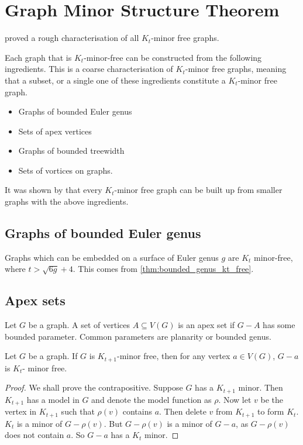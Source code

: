 \section{Graph Minor Structure Theorem}\label{sec:Kt_Minor_Free}
\textcite{robertsonGraphMinorsXVII1999} proved a rough characterisation of all \(K_t\)-minor free graphs. 

Each graph that is $K_t$-minor-free can be constructed from the following ingredients. This is a coarse characterisation of $K_t$-minor free graphs, meaning that a subset, or a single one of these ingredients constitute a $K_t$-minor free graph. 
\begin{itemize}
	\item Graphs of bounded Euler genus
	\item Sets of apex vertices
	\item Graphs of bounded treewidth
	\item Sets of vortices on graphs.
\end{itemize}
It was shown by \textcite{robertsonGraphMinorsXVII1999} that every \(K_t\)-minor free graph can be built up from smaller graphs with the above ingredients.

\subsection{Graphs of bounded Euler genus}

Graphs which can be embedded on a surface of Euler genus $g$ are $K_t$ minor-free, where \(t > \sqrt{6g} + 4\). This comes from \cref{thm:bounded_genus_kt_free}. 

\subsection{Apex sets}\label{sssec:Apex_Vertices}
Let $G$ be a graph. A set of vertices $A \subseteq V(G)$ is an apex set if $G - A$ has some bounded parameter. Common parameters are planarity or bounded genus. 
\begin{theorem}
	Let $G$ be a graph. If \(G\) is \(K_{t + 1}\)-minor free, then for any vertex $a \in V(G)$, $G - a$ is \(K_t\)- minor free. 
\end{theorem}
\begin{proof}
	We shall prove the contrapositive. Suppose \(G\) has a \(K_{t + 1}\) minor. Then \(K_{t + 1}\) has a model in \(G\) and denote the model function as \(\rho\). Now let \(v\) be the vertex in \(K_{t + 1}\) such that \(\rho(v)\) contains \(a\). Then delete \(v\) from \(K_{t + 1}\) to form $K_t$. \(K_t\) is a minor of \(G - \rho(v)\). But \(G - \rho(v)\) is a minor of \(G - a\), as \(G - \rho(v)\) does not contain \(a\). So \(G - a\) has a \(K_t\) minor. 
\end{proof}
